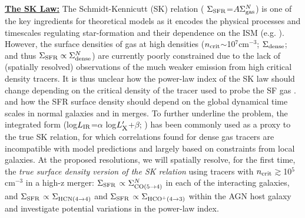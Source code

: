 \documentclass[12pt,a4paper]{article}
\newcommand{\ncrit}{\mbox{$n_{\rm crit}$}\xspace}
\newcommand{\LIR}{\mbox{$L_{\rm IR}$}\xspace}
\newcommand{\rarr}{$\rightarrow$}
\newcommand{\eco}{\mbox{CO($J$=5\rarr4)}\xspace}
\newcommand{\dhcn}{HCN($J$=4\rarr3)\xspace}
\newcommand{\dhcop}{HCO$^+$($J$=4\rarr3)\xspace}
\newcommand{\Lp}[1][CO]{\mbox{$L^{\prime}_\textrm{\fontsize{8pt}{12pt}\selectfont{#1}}$}}
\newcommand{\Fig}[1]{Fig.~\ref{fig:#1}}
\begin{document}
\underline{\bf The SK Law:}
The Schmidt-Kennicutt (SK) relation (%
$\Sigma_{\rm SFR}$=$A\Sigma^N_{\rm gas}$)
is one of the key ingredients
for theoretical models as it encodes the physical processes and timescales
regulating star-formation and their dependence on the ISM 
(e.g. \citealt{Narayanan14a}).
However, the surface densities of gas at high densities (\ncrit$\sim$10$^7$cm$^{-3}$; 
$\Sigma_{\rm dense}$; and thus $\Sigma_{\rm SFR}\propto
\Sigma^N_{\rm dense}$) are currently poorly constrained due to the lack of 
(spatially resolved) observations of the much weaker emission 
from high critical density tracers. %
It is thus unclear how the power-law index of the SK law should change depending on
the critical density of the tracer used to probe the SF gas \citep[e.g.][]{KT07a}.
and how the SFR surface density should depend on the global 
dynamical time scales in normal galaxies and in merges.
To further underline the problem, the integrated form 
(log\LIR=$\alpha$ log\Lp[X]+$\beta$; \citealt{SK})
has been commonly used as a proxy to the true SK relation,
for which correlations found for dense gas tracers
are incompatible with model predictions \citep[\Fig{SF}; Z14;][]{Greve14a}
and largely based on constraints %
from local galaxies. 
At the proposed resolutions, we will spatially resolve, for the first time,
the {\it true surface density version of the SK relation} using tracers with \ncrit$\gtrsim$10$^5$cm$^{-3}$
in a high-z merger: $\Sigma_{\rm SFR}$$\propto$$\Sigma^N_{\rm CO(5\rightarrow4)}$
in each of the interacting galaxies, and 
$\Sigma_{\rm SFR}$$\propto$$\Sigma_{\rm HCN(4\rightarrow4)}$ and 
$\Sigma_{\rm SFR}$$\propto$$\Sigma_{\rm HCO^+(4\rightarrow3)}$
within the AGN host galaxy and investigate potential variations in the power-law index.
\end{document}
